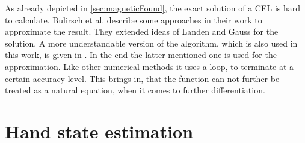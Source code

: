 As already depicted in \ref{sec:magneticFound}, the exact solution of a \ac{CEL} is hard to calculate. Bulirsch et al.  describe some approaches in their work to approximate the result. They extended ideas of Landen and Gauss for the solution. A more understandable version of the algorithm, which is also used in this work, is given in \cite{derby2010cylindrical}.  In the end the latter mentioned one is used for the approximation. Like other numerical methods it uses a loop, to terminate at a certain accuracy level. This brings in, that the function can not further be treated as a natural equation, when it comes to further differentiation.



\section{Hand state estimation} \label{sec:estimation}

